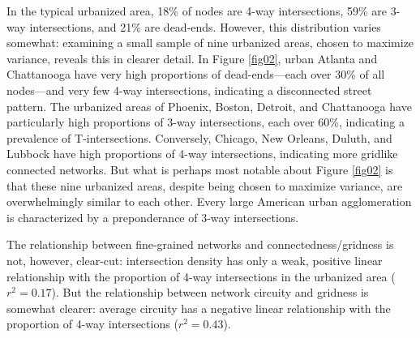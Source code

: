 \documentclass{article}
\begin{document}
In the typical urbanized area, 18\% of nodes are 4-way intersections, 59\% are 3-way intersections, and 21\% are dead-ends. However, this distribution varies somewhat: examining a small sample of nine urbanized areas, chosen to maximize variance, reveals this in clearer detail. In Figure \ref{fig02}, urban Atlanta and Chattanooga have very high proportions of dead-ends---each over 30\% of all nodes---and very few 4-way intersections, indicating a disconnected street pattern. The urbanized areas of Phoenix, Boston, Detroit, and Chattanooga have particularly high proportions of 3-way intersections, each over 60\%, indicating a prevalence of T-intersections. Conversely, Chicago, New Orleans, Duluth, and Lubbock have high proportions of 4-way intersections, indicating more gridlike connected networks. But what is perhaps most notable about Figure \ref{fig02} is that these nine urbanized areas, despite being chosen to maximize variance, are overwhelmingly similar to each other. Every large American urban agglomeration is characterized by a preponderance of 3-way intersections.

The relationship between fine-grained networks and connectedness/gridness is not, however, clear-cut: intersection density has only a weak, positive linear relationship with the proportion of 4-way intersections in the urbanized area ($r^{2}=0.17$). But the relationship between network circuity and gridness is somewhat clearer: average circuity has a negative linear relationship with the proportion of 4-way intersections ($r^{2}=0.43$).
\end{document}

